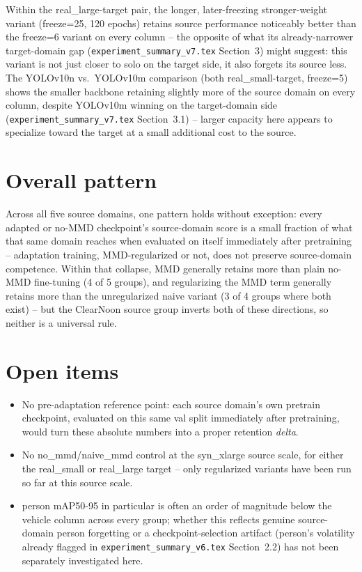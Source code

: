 \documentclass[11pt]{article}
\begin{document}
\noindent Within the real\_large-target pair, the longer, later-freezing
stronger-weight variant (freeze=25, 120 epochs) retains source performance
noticeably better than the freeze=6 variant on every column -- the opposite of what
its already-narrower target-domain gap (\texttt{experiment\_summary\_v7.tex}
Section~3) might suggest: this variant is not just closer to solo on the target
side, it also forgets its source less. The YOLOv10n vs.\ YOLOv10m comparison
(both real\_small-target, freeze=5) shows the smaller backbone retaining slightly
more of the source domain on every column, despite YOLOv10m winning on the
target-domain side (\texttt{experiment\_summary\_v7.tex} Section~3.1) -- larger
capacity here appears to specialize toward the target at a small additional cost
to the source.

\section{Overall pattern}

Across all five source domains, one pattern holds without exception: every adapted
or no-MMD checkpoint's source-domain score is a small fraction of what that same
domain reaches when evaluated on itself immediately after pretraining -- adaptation
training, MMD-regularized or not, does not preserve source-domain competence.
Within that collapse, MMD generally retains more than plain no-MMD fine-tuning
(4 of 5 groups), and regularizing the MMD term generally retains more than the
unregularized naive variant (3 of 4 groups where both exist) -- but the ClearNoon
source group inverts both of these directions, so neither is a universal rule.

\section{Open items}
\label{sec:open}

\begin{itemize}
    \item No pre-adaptation reference point: each source domain's own pretrain
    checkpoint, evaluated on this same val split immediately after pretraining,
    would turn these absolute numbers into a proper retention \emph{delta}.
    \item No no\_mmd/naive\_mmd control at the syn\_xlarge source scale, for either
    the real\_small or real\_large target -- only regularized variants have been
    run so far at this source scale.
    \item person mAP50-95 in particular is often an order of magnitude below the
    vehicle column across every group; whether this reflects genuine source-domain
    person forgetting or a checkpoint-selection artifact (person's volatility
    already flagged in \texttt{experiment\_summary\_v6.tex} Section~2.2) has not
    been separately investigated here.
\end{itemize}
\end{document}
